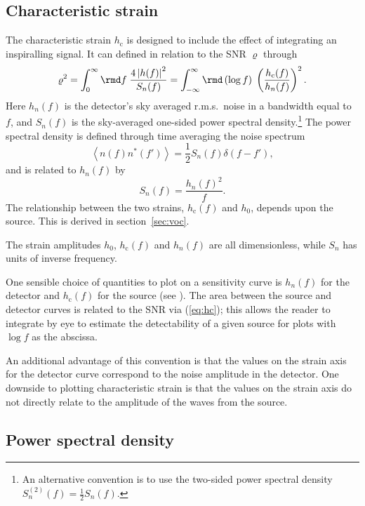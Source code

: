 \documentclass[fleqn,12pt]{iopart}
\newcommand{\sub}[1]{\ensuremath{_\mathrm{#1}}}
\begin{document}
\subsection{Characteristic strain}

The characteristic strain $h\sub{c}$ is designed to include the effect of integrating an inspiralling signal. It can defined in relation to the SNR $\varrho$ through
\begin{equation}\label{eq:hc}
\varrho^{2}
= \int_{0}^{\infty}\rmd f\; \frac{4\left|h(f)\right|^{2}}{S_{n}(f)} =
\int_{-\infty}^{\infty} \rmd\left(\log f\right)\; \left(\frac{h\sub{c}(f)}{h_{n}(f)}\right)^{2}.
\end{equation}
Here $h_{n}(f)$ is the detector's sky averaged r.m.s.\ noise in a bandwidth equal to $f$, and $S_n(f)$ is the sky-averaged one-sided power spectral density.\footnote{An alternative convention is to use the two-sided power spectral density $S^{(2)}_{n}(f)=\frac{1}{2}S_{n}(f)$.} The power spectral density is defined through time averaging the noise spectrum
\begin{equation}
\left<n(f)n^*(f')\right> = \frac{1}{2}S_n(f)\delta(f-f'),
\end{equation}
and is related to $h_n(f)$ by
\begin{equation}\label{eq:powerspectraldensity}
S_{n}(f)=\frac{h_{n}(f)^{2}}{f}.
\end{equation}
The relationship between the two strains, $h\sub{c}(f)$ and $h_{0}$, depends upon the source. This is derived in section~\ref{sec:voc}.

The strain amplitudes $h_{0}$, $h\sub{c}(f)$ and $h_{n}(f)$ are all dimensionless, while $S_{n}$ has units of inverse frequency.

One sensible choice of quantities to plot on a sensitivity curve is $h_{n}(f)$ for the detector and $h\sub{c}(f)$ for the source (see ). The area between the source and detector curves is related to the SNR via (\ref{eq:hc}); this allows the reader to integrate by eye to estimate the detectability of a given source for plots with $\log f$ as the abscissa.

An additional advantage of this convention is that the values on the strain axis for the detector curve correspond to the noise amplitude in the detector. One downside to plotting characteristic strain is that the values on the strain axis do not directly relate to the amplitude of the waves from the source.

\subsection{Power spectral density}\label{sec:psd}
\end{document}
